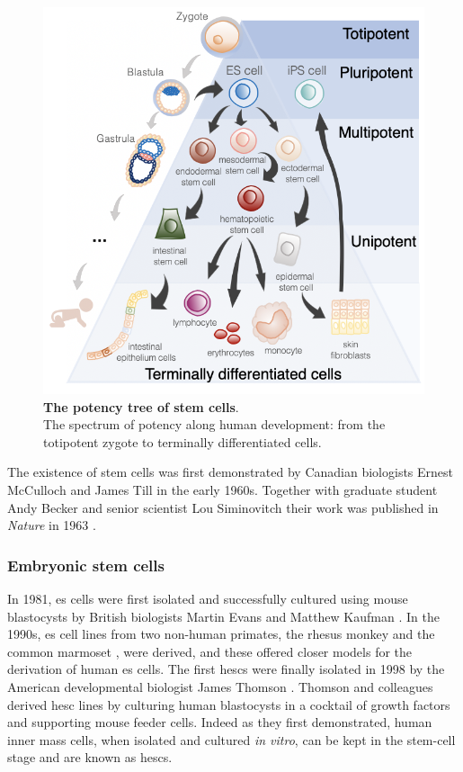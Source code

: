 \begin{figure}[htbp]
\centering
\includegraphics[width=16cm]{Chapter1/Fig/stem_cell_potency.png}
\caption[Stem Cells]{\textbf{The potency tree of stem cells}.\\
The spectrum of potency along human development: from the totipotent zygote to terminally differentiated cells.}
\label{fig:stem_cells}
\end{figure}

The existence of stem cells was first demonstrated by Canadian biologists Ernest McCulloch and James Till in the early 1960s.
Together with graduate student Andy Becker and senior scientist Lou Siminovitch their work was published in \textit{Nature} in 1963 \cite{becker1963cytological}.

\subsubsection{Embryonic stem cells}
\label{sec:esc_induction}

In 1981, \gls{es} cells were first isolated and successfully cultured using mouse blastocysts by British biologists Martin Evans and Matthew Kaufman \cite{evans1981establishment, martin1981isolation}.
In the 1990s, \gls{es} cell lines from two non-human primates, the rhesus monkey \cite{thomson1995isolation} and the common marmoset \cite{thomson1996pluripotent}, were derived, and these offered closer models for the derivation of human \gls{es} cells. 
The first \glspl{hesc} were finally isolated in 1998 by the American developmental biologist James Thomson \cite{thomson1998embryonic}.
Thomson and colleagues derived \gls{hesc} lines by culturing human blastocysts in a cocktail of growth factors and supporting mouse feeder cells.
Indeed as they first demonstrated, human inner mass cells, when isolated and cultured \textit{in vitro}, can be kept in the stem-cell stage and are known as  \glspl{hesc}. \\

